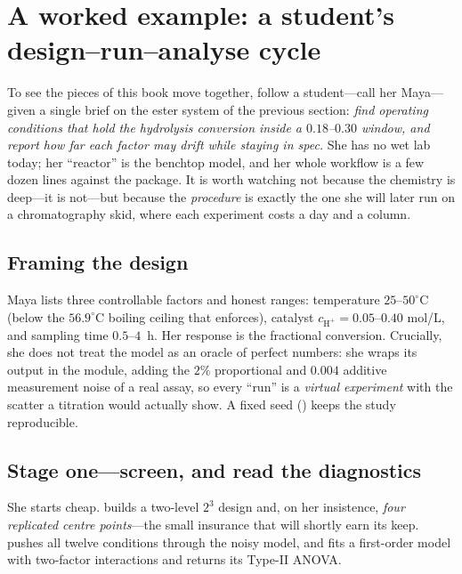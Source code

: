 \section{A worked example: a student's design--run--analyse cycle}
\label{sec:bt-worked}

To see the pieces of this book move together, follow a student---call her
Maya---given a single brief on the ester system of the previous section:
\emph{find operating conditions that hold the hydrolysis conversion inside a
$0.18$--$0.30$ window, and report how far each factor may drift while staying in
spec.} She has no wet lab today; her ``reactor'' is the benchtop model, and her
whole workflow is a few dozen lines against the package. It is worth watching not
because the chemistry is deep---it is not---but because the \emph{procedure} is
exactly the one she will later run on a chromatography skid, where each
experiment costs a day and a column.

\subsection{Framing the design}

Maya lists three controllable factors and honest ranges: temperature
$25$--$50^\circ$C (below the $56.9^\circ$C boiling ceiling that
 enforces), catalyst $c_{\mathrm{H^+}}=0.05$--$0.40$
mol/L, and sampling time $0.5$--$4$~h. Her response is the fractional conversion.
Crucially, she does not treat the model as an oracle of perfect numbers: she wraps
its output in the  module, adding the $2\%$ proportional and
$0.004$ additive measurement noise of a real assay, so every ``run'' is a
\emph{virtual experiment} with the scatter a titration would actually show. A
fixed seed () keeps the study reproducible.

\subsection{Stage one---screen, and read the diagnostics}

She starts cheap.  builds a two-level $2^3$ design and, on
her insistence, \emph{four replicated centre points}---the small insurance that
will shortly earn its keep.  pushes all twelve conditions
through the noisy model, and  fits a first-order model
with two-factor interactions and returns its Type-II ANOVA.

